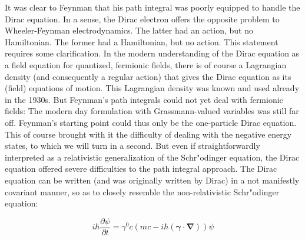 \documentclass[12pt]{article}
\begin{document}
It was clear to Feynman that his path integral was poorly equipped to handle the Dirac equation. In a sense, the Dirac electron offers the opposite problem to Wheeler-Feynman electrodynamics. The latter had an action, but no Hamiltonian. The former had a Hamiltonian, but no action. This statement requires some clarification. In the modern understanding of the Dirac equation as a field equation for quantized, fermionic fields, there is of course a Lagrangian density (and consequently a regular action) that gives the Dirac equation as its (field) equations of motion. This Lagrangian density was known and used already in the 1930s. But Feynman's path integrals could not yet deal with fermionic fields: The modern day formulation with Grassmann-valued variables was still far off. Feynman's starting point could thus only be the one-particle Dirac equation. This of course brought with it the difficulty of dealing with the negative energy states, to which we will turn in a second. But even if straightforwardly interpreted as a relativistic generalization of the Schr"odinger equation, the Dirac equation offered severe difficulties to the path integral approach. The Dirac equation can be written (and was originally written by Dirac) in a not manifestly covariant manner, so as to closely resemble the non-relativistic Schr"odinger equation:

\begin{equation}
i \hbar \frac{\partial \psi}{\partial t} = \gamma^0 c \left( mc - i \hbar \left( \mathbf{\gamma} \cdot \mathbf{\nabla} \right)\right) \psi
\end{equation}
\end{document}
